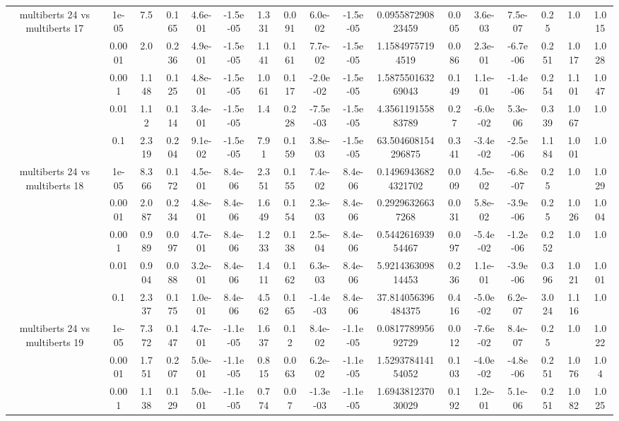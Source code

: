 \begin{tabular}{|c|c|c|c|c|c|c|c|c|c|c|c|c|c|c|c|c|}
\hline
\multirow{5}{*}{multiberts 24 vs multiberts 17} & 1e-05 & 7.5 & 0.165 & 4.6e-01 & -1.5e-05 & 1.331 & 0.091 & 6.0e-02 & -1.5e-05 & 0.095587290823459 & 0.005 & 3.6e-03 & 7.5e-07 & 0.25 & 1.0 & 1.015 \\
 & 0.0001 & 2.0 & 0.236 & 4.9e-01 & -1.5e-05 & 1.141 & 0.161 & 7.7e-02 & -1.5e-05 & 1.15849757194519 & 0.086 & 2.3e-01 & -6.7e-06 & 0.251 & 1.017 & 1.028 \\
 & 0.001 & 1.148 & 0.125 & 4.8e-01 & -1.5e-05 & 1.061 & 0.117 & -2.0e-02 & -1.5e-05 & 1.587550163269043 & 0.149 & 1.1e-01 & -1.4e-06 & 0.254 & 1.101 & 1.047 \\
 & 0.01 & 1.12 & 0.114 & 3.4e-01 & -1.5e-05 & 1.4 & 0.228 & -7.5e-03 & -1.5e-05 & 4.356119155883789 & 0.27 & -6.0e-02 & 5.3e-06 & 0.339 & 1.067 & 1.0 \\
 & 0.1 & 2.319 & 0.204 & 9.1e-02 & -1.5e-05 & 7.91 & 0.159 & 3.8e-03 & -1.5e-05 & 63.504608154296875 & 0.341 & -3.4e-02 & -2.5e-06 & 1.184 & 1.001 & 1.0 \\
\hline
\multirow{5}{*}{multiberts 24 vs multiberts 18} & 1e-05 & 8.366 & 0.172 & 4.5e-01 & 8.4e-06 & 2.351 & 0.155 & 7.4e-02 & 8.4e-06 & 0.14969436824321702 & 0.009 & 4.5e-02 & -6.8e-07 & 0.25 & 1.0 & 1.029 \\
 & 0.0001 & 2.087 & 0.234 & 4.8e-01 & 8.4e-06 & 1.649 & 0.154 & 2.3e-03 & 8.4e-06 & 0.29296326637268 & 0.031 & 5.8e-02 & -3.9e-06 & 0.25 & 1.026 & 1.004 \\
 & 0.001 & 0.989 & 0.097 & 4.7e-01 & 8.4e-06 & 1.233 & 0.138 & 2.5e-04 & 8.4e-06 & 0.544261693954467 & 0.097 & -5.4e-02 & -1.2e-06 & 0.252 & 1.0 & 1.0 \\
 & 0.01 & 0.904 & 0.088 & 3.2e-01 & 8.4e-06 & 1.411 & 0.162 & 6.3e-03 & 8.4e-06 & 5.921436309814453 & 0.236 & 1.1e-01 & -3.9e-06 & 0.396 & 1.021 & 1.001 \\
 & 0.1 & 2.337 & 0.175 & 1.0e-01 & 8.4e-06 & 4.562 & 0.165 & -1.4e-03 & 8.4e-06 & 37.814056396484375 & 0.416 & -5.0e-02 & 6.2e-07 & 3.024 & 1.116 & 1.0 \\
\hline
\multirow{5}{*}{multiberts 24 vs multiberts 19} & 1e-05 & 7.372 & 0.147 & 4.7e-01 & -1.1e-05 & 1.637 & 0.12 & 8.4e-02 & -1.1e-05 & 0.081778995692729 & 0.012 & -7.6e-02 & 8.4e-07 & 0.25 & 1.0 & 1.022 \\
 & 0.0001 & 1.751 & 0.207 & 5.0e-01 & -1.1e-05 & 0.815 & 0.063 & 6.2e-02 & -1.1e-05 & 1.529378414154052 & 0.103 & -4.0e-02 & -4.8e-06 & 0.251 & 1.076 & 1.04 \\
 & 0.001 & 1.138 & 0.129 & 5.0e-01 & -1.1e-05 & 0.774 & 0.07 & -1.3e-03 & -1.1e-05 & 1.694381237030029 & 0.192 & 1.2e-01 & 5.1e-06 & 0.251 & 1.082 & 1.025 \\

\end{tabular}
